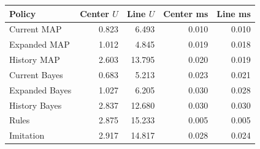\begin{tabular}{lrrrr}
\toprule
Policy & Center $U$ & Line $U$ & Center ms & Line ms \\
\midrule
Current MAP & 0.823 & 6.493 & 0.010 & 0.010 \\
Expanded MAP & 1.012 & 4.845 & 0.019 & 0.018 \\
History MAP & 2.603 & 13.795 & 0.020 & 0.019 \\
Current Bayes & 0.683 & 5.213 & 0.023 & 0.021 \\
Expanded Bayes & 1.027 & 6.205 & 0.030 & 0.028 \\
History Bayes & 2.837 & 12.680 & 0.030 & 0.030 \\
Rules & 2.875 & 15.233 & 0.005 & 0.005 \\
Imitation & 2.917 & 14.817 & 0.028 & 0.024 \\
\bottomrule
\end{tabular}
